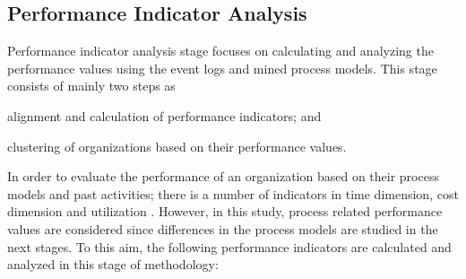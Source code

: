 \subsection{Performance Indicator Analysis}
\label{subsec:performance-indicator-analysis}
Performance indicator analysis stage focuses on calculating and analyzing the performance values using the event logs and mined process models. This stage consists of mainly two steps as 
\begin{inparaenum}
\item alignment and calculation of performance indicators; and
\item clustering of organizations based on their performance values.
\end{inparaenum}
In order to evaluate the performance of an organization based on their process models and past activities; there is a number of indicators in time dimension, cost dimension and utilization \cite{van2011process}. However, in this study, process related performance values are considered since differences in the process models are studied in the next stages. To this aim, the following performance indicators are calculated and analyzed in this stage of methodology:
